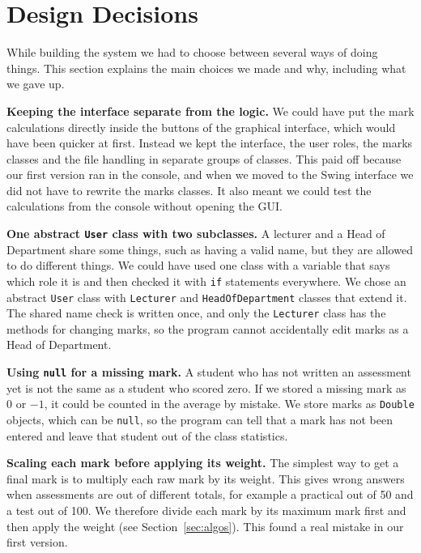 \section{Design Decisions}\label{sec:decisions}

While building the system we had to choose between several ways of doing things. This section explains the main choices we made and why, including what we gave up.

\textbf{Keeping the interface separate from the logic.} We could have put the mark calculations directly inside the buttons of the graphical interface, which would have been quicker at first. Instead we kept the interface, the user roles, the marks classes and the file handling in separate groups of classes. This paid off because our first version ran in the console, and when we moved to the Swing interface we did not have to rewrite the marks classes. It also meant we could test the calculations from the console without opening the GUI.

\textbf{One abstract \texttt{User} class with two subclasses.} A lecturer and a Head of Department share some things, such as having a valid name, but they are allowed to do different things. We could have used one class with a variable that says which role it is and then checked it with \texttt{if} statements everywhere. We chose an abstract \texttt{User} class with \texttt{Lecturer} and \texttt{HeadOfDepartment} classes that extend it. The shared name check is written once, and only the \texttt{Lecturer} class has the methods for changing marks, so the program cannot accidentally edit marks as a Head of Department.

\textbf{Using \texttt{null} for a missing mark.} A student who has not written an assessment yet is not the same as a student who scored zero. If we stored a missing mark as $0$ or $-1$, it could be counted in the average by mistake. We store marks as \texttt{Double} objects, which can be \texttt{null}, so the program can tell that a mark has not been entered and leave that student out of the class statistics.

\textbf{Scaling each mark before applying its weight.} The simplest way to get a final mark is to multiply each raw mark by its weight. This gives wrong answers when assessments are out of different totals, for example a practical out of 50 and a test out of 100. We therefore divide each mark by its maximum mark first and then apply the weight (see Section~\ref{sec:algos}). This found a real mistake in our first version.

